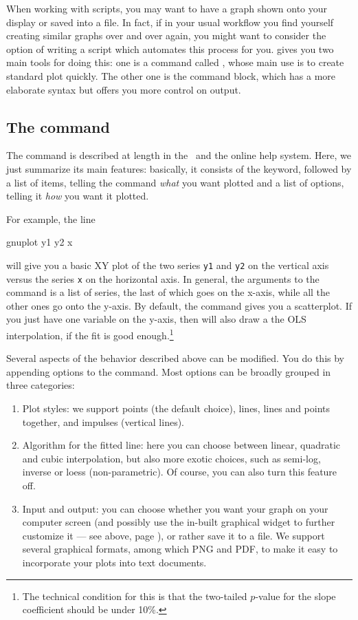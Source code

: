When working with scripts, you may want to have a graph shown onto
your display or saved into a file. In fact, if in your usual workflow
you find yourself creating similar graphs over and over again, you
might want to consider the option of writing a script which automates
this process for you.  gives you two main tools for doing
this: one is a command called , whose main use is to
create standard plot quickly. The other one is the  command
block, which has a more elaborate syntax but offers you more control
on output.

\subsection{The  command}
\label{sec:gnuplot-cmd}

The  command is described at length in the \GCR\ and the
online help system. Here, we just summarize its main features:
basically, it consists of the  keyword, followed by a
list of items, telling the command \emph{what} you want plotted and a
list of options, telling it \emph{how} you want it plotted.

For example, the line
\begin{code}
gnuplot y1 y2 x   
\end{code}
will give you a basic XY plot of the two series \texttt{y1} and
\texttt{y2} on the vertical axis versus the series \texttt{x} on the
horizontal axis. In general, the arguments to the 
command is a list of series, the last of which goes on the x-axis,
while all the other ones go onto the y-axis. By default, the
 command gives you a scatterplot. If you just have one
variable on the y-axis, then  will also draw a the OLS
interpolation, if the fit is good enough.\footnote{The technical
  condition for this is that the two-tailed $p$-value for the slope
  coefficient should be under 10\%.}

Several aspects of the behavior described above can be modified. You
do this by appending options to the command. Most options can be
broadly grouped in three categories:
\begin{enumerate}
\item Plot styles: we support points (the default choice), lines,
  lines and points together, and impulses (vertical lines). 
\item Algorithm for the fitted line: here you can choose between
  linear, quadratic and cubic interpolation, but also more exotic
  choices, such as semi-log, inverse or loess (non-parametric). Of
  course, you can also turn this feature off.
\item Input and output: you can choose whether you want your graph on
  your computer screen (and possibly use the in-built graphical widget
  to further customize it --- see above, page \pageref{plot-editor}),
  or rather save it to a file. We support several graphical formats,
  among which PNG and PDF, to make it easy to incorporate your
  plots into text documents.
\end{enumerate}

